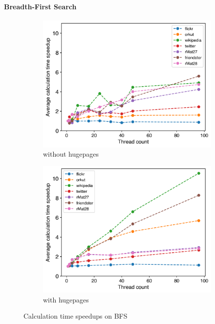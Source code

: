 \paragraph{Breadth-First Search}
\begin{figure}
	\hfil
	\begin{subfigure}{0.48\columnwidth}
		\includegraphics[width=\linewidth]{../../plots/singleNodeBFSGaloisThreads.png}
		\caption{without hugepages}
		\label{fig:galoisSpeedupBFS_noHP}
	\end{subfigure}
	\begin{subfigure}{0.48\columnwidth}
		\includegraphics[width=\linewidth]{../../plots/singleNodeBFSGaloisHPThreads.png}
		\caption{with hugepages}
		\label{fig:galoisSpeedupBFS_HP}
	\end{subfigure}
	\hfil
	\caption{Calculation time speedups on BFS}
	\label{fig:galoisSpeedupBFS}
\end{figure}

